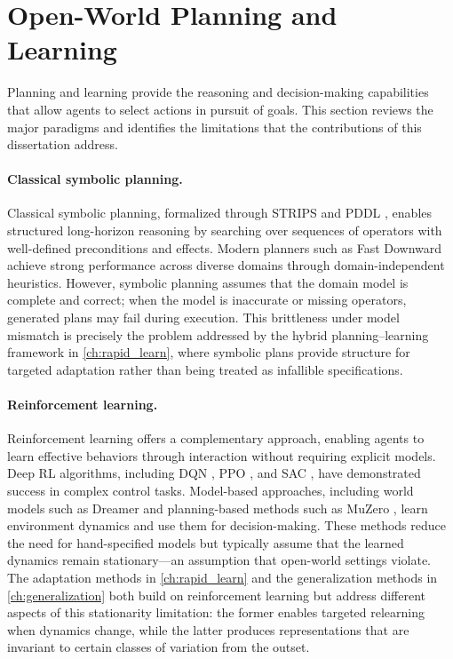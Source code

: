 \section{Open-World Planning and Learning}
\label{sec:rw_planning_learning}

Planning and learning provide the reasoning and decision-making capabilities that allow agents to select actions in pursuit of goals. This section reviews the major paradigms and identifies the limitations that the contributions of this dissertation address.

\paragraph{Classical symbolic planning.}
Classical symbolic planning, formalized through STRIPS \citep{fikes1971strips} and PDDL \citep{mcdermott1998pddl}, enables structured long-horizon reasoning by searching over sequences of operators with well-defined preconditions and effects. Modern planners such as Fast Downward \citep{helmert2006fast} achieve strong performance across diverse domains through domain-independent heuristics. However, symbolic planning assumes that the domain model is complete and correct; when the model is inaccurate or missing operators, generated plans may fail during execution. This brittleness under model mismatch is precisely the problem addressed by the hybrid planning--learning framework in \cref{ch:rapid_learn}, where symbolic plans provide structure for targeted adaptation rather than being treated as infallible specifications.

\paragraph{Reinforcement learning.}
Reinforcement learning offers a complementary approach, enabling agents to learn effective behaviors through interaction without requiring explicit models. Deep RL algorithms, including DQN \citep{mnih2015human}, PPO \citep{schulman2017proximal}, and SAC \citep{haarnoja2018soft}, have demonstrated success in complex control tasks. Model-based approaches, including world models such as Dreamer \citep{hafner2023mastering} and planning-based methods such as MuZero \citep{schrittwieser2020mastering}, learn environment dynamics and use them for decision-making. These methods reduce the need for hand-specified models but typically assume that the learned dynamics remain stationary---an assumption that open-world settings violate. The adaptation methods in \cref{ch:rapid_learn} and the generalization methods in \cref{ch:generalization} both build on reinforcement learning but address different aspects of this stationarity limitation: the former enables targeted relearning when dynamics change, while the latter produces representations that are invariant to certain classes of variation from the outset.

